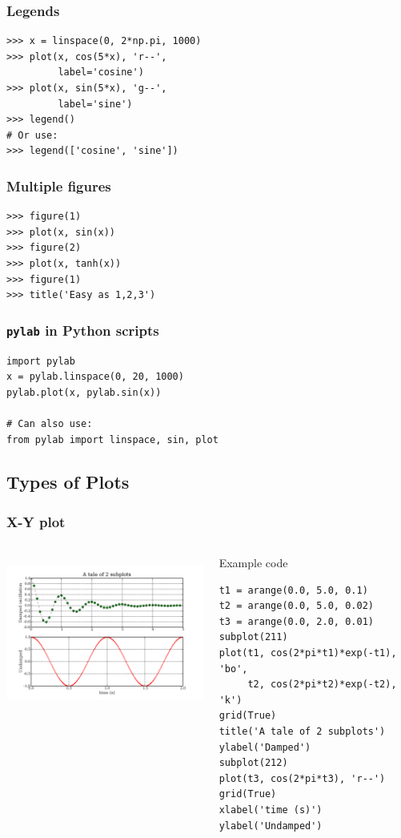 \documentclass[14pt,compress]{beamer}
\newcounter{time}
\newcommand{\inctime}[1]{\addtocounter{time}{#1}{\tiny \thetime\ m}}
\newcommand{\typ}[1]{\lstinline{#1}}
\begin{document}
\begin{frame}[fragile]
  \frametitle{Legends}
\begin{lstlisting}
>>> x = linspace(0, 2*np.pi, 1000)
>>> plot(x, cos(5*x), 'r--', 
         label='cosine')
>>> plot(x, sin(5*x), 'g--', 
         label='sine')
>>> legend() 
# Or use:
>>> legend(['cosine', 'sine'])
\end{lstlisting}
\end{frame}

\begin{frame}[fragile]
    \frametitle{Multiple figures}

\begin{lstlisting}
>>> figure(1)
>>> plot(x, sin(x))
>>> figure(2)
>>> plot(x, tanh(x))
>>> figure(1)
>>> title('Easy as 1,2,3')
\end{lstlisting}
    

\end{frame}

\begin{frame}[fragile]
    \frametitle{\typ{pylab} in Python scripts}
\begin{lstlisting}
import pylab
x = pylab.linspace(0, 20, 1000)
pylab.plot(x, pylab.sin(x))

# Can also use:
from pylab import linspace, sin, plot
\end{lstlisting}
\inctime{10}
\end{frame}

\subsection{Types of Plots}
\begin{frame}[fragile]
  \frametitle{X-Y plot}
  \begin{columns}
    \hspace*{-0.5in}
    \includegraphics[height=2in, interpolate=true]{data/xyplot}
    \begin{block}{Example code}
    \tiny
\begin{lstlisting}
t1 = arange(0.0, 5.0, 0.1)
t2 = arange(0.0, 5.0, 0.02)
t3 = arange(0.0, 2.0, 0.01)
subplot(211)
plot(t1, cos(2*pi*t1)*exp(-t1), 'bo', 
     t2, cos(2*pi*t2)*exp(-t2), 'k')
grid(True)
title('A tale of 2 subplots')
ylabel('Damped')
subplot(212)
plot(t3, cos(2*pi*t3), 'r--')
grid(True)
xlabel('time (s)')
ylabel('Undamped')
\end{lstlisting}
    \end{block}
  \end{columns}
\end{frame}
\end{document}
